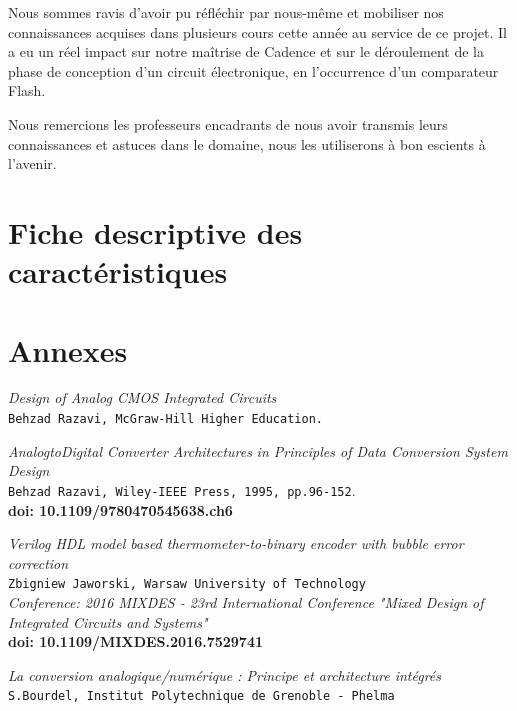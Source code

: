\documentclass[11pt]{article}
\begin{document}
Nous sommes ravis d'avoir pu r\'efl\'echir par nous-m\^eme et mobiliser nos connaissances acquises dans plusieurs cours cette ann\'ee au service
de ce projet. Il a eu un r\'eel impact sur notre maîtrise de Cadence et sur le d\'eroulement de la phase de conception d'un circuit \'electronique,
en l'occurrence d'un comparateur Flash.

Nous remercions les professeurs encadrants de nous avoir transmis leurs connaissances et astuces dans le domaine, nous les utiliserons
\`a bon escients \`a l'avenir.

\clearpage

\section{Fiche descriptive des caract\'eristiques}

\clearpage

\section{Annexes}

\clearpage


\begin{thebibliography}{9}
\textit{Design of Analog CMOS Integrated Circuits}
\\\texttt{Behzad Razavi, McGraw-Hill Higher Education.}

\textit{AnalogtoDigital Converter Architectures}
\textit{in Principles of Data Conversion System Design}\\
\texttt{Behzad Razavi, Wiley-IEEE Press, 1995, pp.96-152}.\\
\textbf{doi: 10.1109/9780470545638.ch6}

\textit{Verilog HDL model based thermometer-to-binary encoder with bubble error correction}\\
\texttt{Zbigniew Jaworski, Warsaw University of Technology}\\
\textit{Conference: 2016 MIXDES - 23rd International Conference "Mixed Design of Integrated Circuits and Systems"}\\
\textbf{doi: 10.1109/MIXDES.2016.7529741}

\textit{La conversion analogique/num\'erique : Principe et architecture int\'egr\'es}\\
\texttt{S.Bourdel, Institut Polytechnique de Grenoble - Phelma}

\end{thebibliography}
\end{document}
